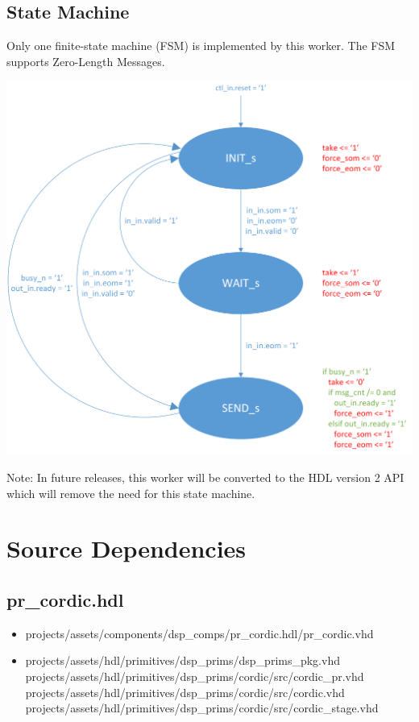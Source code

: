 \documentclass{article}
\def\comp{pr\_cordic}
\begin{document}
	\subsection*{State Machine}
	\begin{flushleft}
		Only one finite-state machine (FSM) is implemented by this worker. The FSM supports Zero-Length Messages.
	\end{flushleft}
	{\centering\captionsetup{type=figure}\includegraphics[scale=0.6]{zlm_fsm}\par{}\label{fig:zlm_fsm}}
        \begin{flushleft}
	        Note: In future releases, this worker will be converted to the HDL version 2 API which will remove the need for this state machine.
        \end{flushleft}


\section*{Source Dependencies}
\subsection*{\comp.hdl}
\begin{itemize}
	\item projects/assets/components/dsp\_comps/pr\_cordic.hdl/pr\_cordic.vhd
	\item projects/assets/hdl/primitives/dsp\_prims/dsp\_prims\_pkg.vhd
	      \subitem projects/assets/hdl/primitives/dsp\_prims/cordic/src/cordic\_pr.vhd
	      \subitem projects/assets/hdl/primitives/dsp\_prims/cordic/src/cordic.vhd
	      \subitem projects/assets/hdl/primitives/dsp\_prims/cordic/src/cordic\_stage.vhd
\end{itemize}
\end{document}
